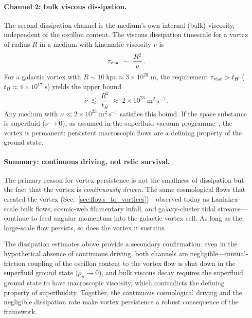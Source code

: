 \documentclass[11pt]{article}
\begin{document}
\paragraph{Channel 2: bulk viscous dissipation.}
The second dissipation channel is the medium's own internal
(bulk) viscosity, independent of the oscillon content.
The viscous dissipation timescale for a vortex of radius $R$
in a medium with kinematic viscosity $\nu$ is
\begin{equation}\label{eq:tau_visc}
  \tau_{\rm visc} \;\sim\; \frac{R^{2}}{\nu}\,.
\end{equation}
For a galactic vortex with $R \sim 10\;\mathrm{kpc}
\approx 3\times10^{20}\;\mathrm{m}$, the requirement
$\tau_{\rm visc} > t_{H}$ ($t_{H} \approx
4\times10^{17}\;\mathrm{s}$) yields the upper bound
\begin{equation}\label{eq:nu_bound}
  \nu \;\lesssim\; \frac{R^{2}}{t_{H}}
  \;\approx\; 2\times10^{23}\;\mathrm{m^{2}\,s^{-1}}\,.
\end{equation}
Any medium with $\nu \ll 2\times10^{23}\;\mathrm{m^{2}\,s^{-1}}$
satisfies this bound.  If the space substance is superfluid
($\nu \to 0$), as assumed in the superfluid vacuum
programme~\cite{Volovik2003}, the vortex is permanent:
persistent macroscopic flows are a defining property of the
ground state.

\paragraph{Summary: continuous driving, not relic survival.}
The primary reason for vortex persistence is not the smallness
of dissipation but the fact that the vortex is
\emph{continuously driven}.  The same cosmological flows that
created the vortex (Sec.~\ref{sec:flows_to_vortices})---observed
today as Laniakea-scale bulk flows, cosmic-web filamentary
infall, and galaxy-cluster tidal streams---continue to feed
angular momentum into the galactic vortex cell.  As long as the
large-scale flow persists, so does the vortex it sustains.

The dissipation estimates above provide a secondary confirmation:
even in the hypothetical absence of continuous driving, both
channels are negligible---mutual-friction coupling of the oscillon
content to the vortex flow is shut down in the superfluid ground
state ($\rho_n\to 0$), and bulk viscous decay
requires the superfluid ground state to have macroscopic viscosity,
which contradicts the defining property of superfluidity.
Together, the continuous cosmological driving and the negligible
dissipation rate make vortex persistence a robust consequence
of the framework.
\end{document}
